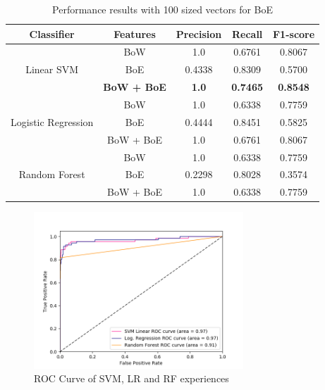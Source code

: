 \begin{table}[!bp]
	\small
	\centering
	\caption{Performance results with 100 sized vectors for BoE}
	\label{classifiers}
	\begin{tabular}{c|c|c|c|c}
		\hline
		\textbf{Classifier}                  & \textbf{Features} & \textbf{Precision} & \textbf{Recall} & \textbf{F1-score} \\ \hline
		\multirow{3}{*}{Linear SVM}          & BoW               & 1.0                & 0.6761          & 0.8067            \\
		& BoE               & 0.4338             & 0.8309          & 0.5700            \\
		& \textbf{BoW + BoE}         & \textbf{1.0}       & \textbf{0.7465} & \textbf{0.8548}   \\ \hline
		\multirow{3}{*}{Logistic Regression} & BoW               & 1.0                & 0.6338          & 0.7759            \\
		& BoE               & 0.4444             & 0.8451          & 0.5825            \\
		& BoW + BoE         & 1.0                & 0.6761          & 0.8067            \\ \hline
		\multirow{3}{*}{Random Forest}       & BoW               & 1.0                & 0.6338          & 0.7759            \\
		& BoE               & 0.2298             & 0.8028          & 0.3574            \\
		& BoW + BoE         & 1.0                & 0.6338          & 0.7759            \\ \hline
	\end{tabular}
\end{table}


\begin{figure}[!htp]
	\centering
	\includegraphics[width=0.7\textwidth]{figures/roc_auc_brazilian_travel_related}
	\caption{ROC Curve of SVM, LR and RF experiences}
	\label{fig:roc_curve}
\end{figure}

